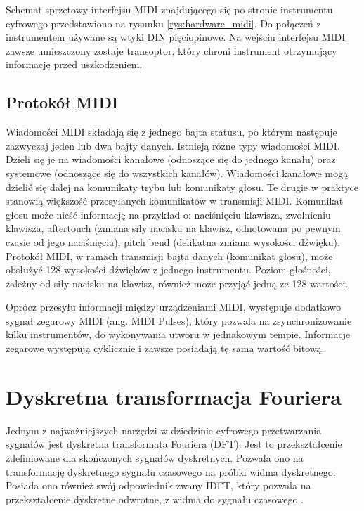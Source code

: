 Schemat sprzętowy interfejsu MIDI znajdującego się po stronie instrumentu cyfrowego przedstawiono na rysunku \ref{rys:hardware_midi}. Do połączeń z instrumentem używane są wtyki DIN pięciopinowe. Na wejściu interfejsu MIDI zawsze umieszczony zostaje transoptor, który chroni instrument otrzymujący informację przed uszkodzeniem.

\subsection{Protokół MIDI}
Wiadomości MIDI składają się z jednego bajta statusu, po którym następuje zazwyczaj jeden lub dwa bajty danych. Istnieją różne typy wiadomości MIDI. Dzieli się je na wiadomości kanałowe (odnoszące się do jednego kanału) oraz systemowe (odnoszące się do wszystkich kanałów). Wiadomości kanałowe mogą dzielić się dalej na komunikaty trybu lub komunikaty głosu. Te drugie w praktyce stanowią większość przesyłanych komunikatów w transmisji MIDI.
Komunikat głosu może nieść informację na przykład o: naciśnięciu klawisza, zwolnieniu klawisza, aftertouch (zmiana siły nacisku na klawisz, odnotowana po pewnym czasie od jego naciśnięcia), pitch bend (delikatna zmiana wysokości dźwięku). Protokół MIDI, w ramach transmisji bajta danych (komunikat głosu), może obsłużyć 128 wysokości dźwięków z jednego instrumentu. Poziom głośności, zależny od siły nacisku na klawisz, również może przyjąć jedną ze 128 wartości.

Oprócz przesyłu informacji między urządzeniami MIDI, występuje dodatkowo sygnał zegarowy MIDI (ang. MIDI Pulses), który pozwala na zsynchronizowanie kilku instrumentów, do wykonywania utworu w jednakowym tempie. Informacje zegarowe występują cyklicznie i zawsze posiadają tę samą wartość bitową.



\section{Dyskretna transformacja Fouriera}
Jednym z najważniejszych narzędzi w dziedzinie cyfrowego przetwarzania sygnałów jest dyskretna transformata Fouriera (DFT). Jest to przekształcenie zdefiniowane dla skończonych sygnałów dyskretnych. Pozwala ono na transformację dyskretnego sygnału czasowego na próbki widma dyskretnego. Posiada ono również swój odpowiednik zwany IDFT, który pozwala na przekształcenie dyskretne odwrotne, z widma do sygnału czasowego \cite{lesnicki}.

